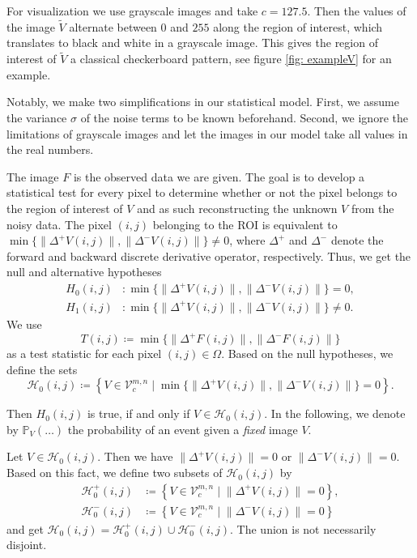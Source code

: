 \documentclass[a4paper,12pt]{article}
\newcommand{\norm}[1]{\lVert#1\rVert}
\theoremstyle{plain}
\theoremstyle{definition}
\begin{document}
For visualization we use grayscale images and take $c = 127.5$. Then the values of the image $\tilde{V}$ alternate between $0$ and $255$ along the region of interest, which translates to black and white in a grayscale image. This gives the region of interest of $\tilde{V}$ a classical checkerboard pattern, see figure \ref{fig: exampleV} for an example.

Notably, we make two simplifications in our statistical model. First, we assume the variance $\sigma$ of the noise terms to be known beforehand. Second, we ignore the limitations of grayscale images and let the images in our model take all values in the real numbers.

The image $F$ is the observed data we are given. The goal is to develop a statistical test for every pixel to determine whether or not the pixel belongs to the region of interest of $V$ and as such reconstructing the unknown $V$ from the noisy data. The pixel $(i, j)$ belonging to the ROI is equivalent to $\min \{ \norm{\Delta^+ V(i, j)}, \norm{\Delta^- V(i, j)} \} \neq 0$, where $\Delta^+$ and $\Delta^-$ denote the forward and backward discrete derivative operator, respectively. Thus, we get the null and alternative hypotheses
\begin{align*}
	H_0(i, j)&: \min \{ \norm{\Delta^+ V(i, j)}, \norm{\Delta^- V(i, j)} \} = 0, \\
	H_1(i, j)&: \min \{ \norm{\Delta^+ V(i, j)}, \norm{\Delta^- V(i, j)} \} \neq 0.
\end{align*}
We use
\begin{equation*}
	T(i, j) \coloneqq \min \{ \norm{\Delta^+ F(i, j)}, \norm{\Delta^- F(i, j)} \}
\end{equation*}
as a test statistic for each pixel $(i, j) \in \Omega$. Based on the null hypotheses, we define the sets
\begin{equation*}
	\mathcal{H}_0(i, j) \coloneqq \left\{ V \in \mathcal{V}_c^{m, n} \mid \min \{ \norm{\Delta^+ V(i, j)}, \norm{\Delta^- V(i, j)} \} = 0 \right\}.
\end{equation*}

Then $H_0(i, j)$ is true, if and only if $V \in \mathcal{H}_0(i, j)$. In the following, we denote by $\mathbb{P}_V( \ldots )$ the probability of an event given a \emph{fixed} image $V$.

Let $V \in \mathcal{H}_0(i, j)$. Then we have $\norm{\Delta^+ V(i, j)} = 0$ or $\norm{\Delta^- V(i, j)} = 0$. Based on this fact, we define two subsets of $\mathcal{H}_0(i, j)$ by
\begin{align*}
	\mathcal{H}_0^+(i, j) &\coloneqq \left\{ V \in \mathcal{V}_c^{m, n} \mid \norm{\Delta^+ V(i, j)} = 0 \right\}, \\
	\mathcal{H}_0^-(i, j) &\coloneqq \left\{ V \in \mathcal{V}_c^{m, n} \mid \norm{\Delta^- V(i, j)} = 0 \right\}
\end{align*}
and get $\mathcal{H}_0(i, j) = \mathcal{H}_0^+(i, j) \cup \mathcal{H}_0^-(i, j)$. The union is not necessarily disjoint.
\end{document}

